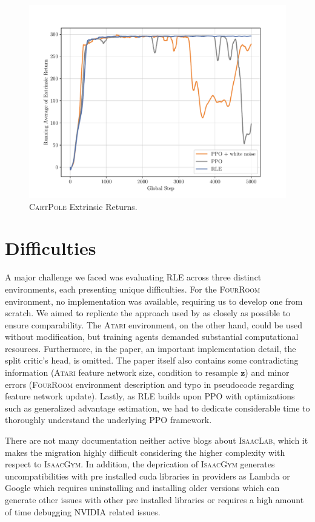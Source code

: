 \begin{figure}[H]
  \centering
  \includegraphics[width=\textwidth]{figures/plot_Cartpole_Extrinsic Return.pdf}
  \caption{\textsc{CartPole} Extrinsic Returns.}
  \label{fig:cartpole-return}
\end{figure}

\hypertarget{appendix-difficult}{\section{Difficulties}}

\noindent A major challenge we faced was evaluating \textsc{RLE} across three distinct environments, each presenting unique difficulties. For the \textsc{FourRoom} environment, no implementation was available, requiring us to develop one from scratch. We aimed to replicate the approach used by \cite{rle-paper} as closely as possible to ensure comparability. The \textsc{Atari} environment, on the other hand, could be used without modification, but training agents demanded substantial computational resources. Furthermore, in the paper, an important implementation detail, the split critic's head, is omitted. The paper itself also contains some contradicting information (\textsc{Atari} feature network size, condition to resample $\textbf{z}$) and minor errors (\textsc{FourRoom} environment description and typo in pseudocode regarding feature network update). Lastly, as \textsc{RLE} builds upon \textsc{PPO} with optimizations such as generalized advantage estimation, we had to dedicate considerable time to thoroughly understand the underlying \textsc{PPO} framework.

\noindent There are not many documentation neither active blogs about \textsc{IsaacLab}, which it makes the migration highly difficult considering the higher complexity with respect
to \textsc{IsaacGym}. In addition, the deprication of \textsc{IsaacGym} generates uncompatibilities with pre installed cuda libraries in providers as Lambda or Google which requires uninstalling
and installing older versions which can generate other issues with other pre installed libraries or requires a high amount of time debugging NVIDIA related issues.